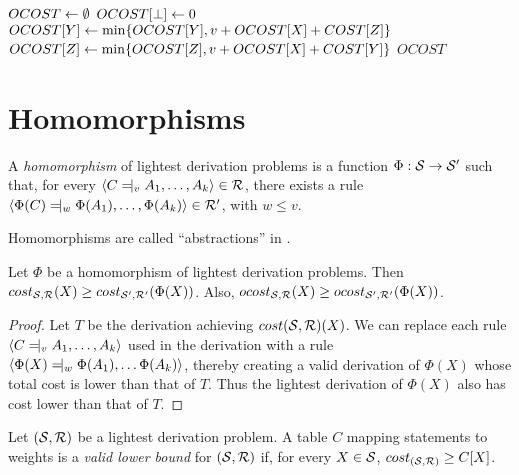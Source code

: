 \begin{algorithm}
\caption{$outside(\SSS,\RRR,COST)$}
\begin{algorithmic}
  \STATE $OCOST \leftarrow \emptyset$
  \STATE $OCOST[\perp] \leftarrow 0$
  \STATE $OCOST[Y] \leftarrow \min \{ OCOST[Y], v + OCOST[X] + COST[Z]\}$
  \STATE $OCOST[Z] \leftarrow \min \{ OCOST[Z], v + OCOST[X] + COST[Y]\}$
  \ENDFOR
  \ENDFOR
  \RETURN $OCOST$
\end{algorithmic}
\label{alg-outside}
\end{algorithm}


\section{Homomorphisms}

\begin{defn}[Homomorphism]
  A {\em homomorphism} of lightest derivation problems is a function
  $\Phi : {\mathcal S} \to {\mathcal S}'$ such that, for every $\langle C \tne_v A_1,
  \dots, A_k \rangle \in \RRR$, there exists a rule $\langle \Phi(C)
  \tne_w \Phi(A_1), \dots, \Phi(A_k)\rangle\in \RRR'$, with $w\le v$.
\end{defn}
Homomorphisms are called ``abstractions'' in \cite{astar}.

\begin{lem}
  Let $\Phi$ be a homomorphism of lightest derivation problems. Then
  $cost_{{\mathcal S},{\mathcal R}}(X) \ge cost_{{\mathcal S}',{\mathcal R}'}(\Phi(X))$. Also, 
  $ocost_{{\mathcal S},{\mathcal R}}(X) \ge ocost_{{\mathcal S}',{\mathcal R}'}(\Phi(X))$.
\end{lem}
\begin{proof}
  Let $T$ be the derivation achieving $cost({\mathcal S},{\mathcal R})(X)$. We can
  replace each rule $\langle C\tne_v A_1, \dots, A_k \rangle$ used in
  the derivation with a rule $\langle \Phi(X) \tne_w \Phi(A_1), \dots
  \Phi(A_k) \rangle$, thereby creating a valid derivation of $\Phi(X)$
  whose total cost is lower than that of $T$. Thus the lightest
  derivation of $\Phi(X)$ also has cost lower than that of $T$.
\end{proof}

\begin{defn}
Let $({\mathcal S},{\mathcal R})$ be a lightest derivation problem. A table $C$
mapping statements to weights is a {\em valid lower bound} for
$({\mathcal S},{\mathcal R})$ if, for every $X\in {\mathcal S}$, $cost_{({\mathcal S},{\mathcal R})} \ge
C[X]$.
\end{defn}

